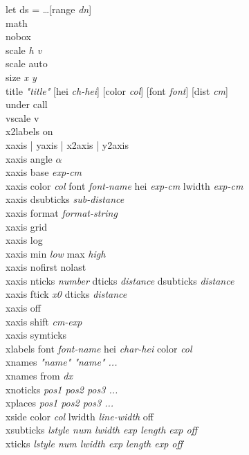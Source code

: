 {\sf let ds = \ldots [range {\it dn}]} \\
{\sf math } \\
{\sf nobox } \\
{\sf scale {\it h v}} \\
{\sf scale auto} \\
{\sf size {\it x y }}\\
{\sf title {\it "title"}  [hei {\it ch-hei}] [color {\it col}] [font {\it font}] [dist {\it cm}]  }   \\
{\sf under call} \\
{\sf vscale v} \\
{\sf x2labels on} \\
{\sf xaxis | yaxis | x2axis | y2axis}\\
{\sf xaxis angle $\alpha$} \\
{\sf xaxis base {\it exp-cm}}  \\
{\sf xaxis color {\it col} font {\it font-name}  hei {\it exp-cm} lwidth {\it exp-cm}} \\
{\sf xaxis dsubticks {\it sub-distance} }  \\
{\sf xaxis format {\it format-string} } \\
{\sf xaxis grid }  \\
{\sf xaxis log}  \\
{\sf xaxis min {\it low} max {\it high}}  \\
{\sf xaxis nofirst nolast}  \\
{\sf xaxis nticks {\it number} dticks {\it distance} dsubticks {\it distance}} \\
{\sf xaxis ftick {\it x0} dticks {\it distance}} \\
{\sf xaxis off}  \\
{\sf xaxis shift {\it cm-exp}}  \\
{\sf xaxis symticks} \\
{\sf xlabels font {\it font-name} hei {\it char-hei} color {\it col} }\\
{\sf xnames {\it "name"  "name" ...}}  \\
{\sf xnames from {\it dx}}  \\
{\sf xnoticks {\it pos1 pos2 pos3 ...}}  \\
{\sf xplaces {\it pos1 pos2 pos3 ...}}  \\
{\sf xside color {\it col} lwidth {\it line-width} off  } \\
{\sf xsubticks {\it {\sf lstyle} num  {\sf lwidth} exp {\sf length} exp  {\sf off}}} \\
{\sf xticks {\it {\sf lstyle} num {\sf lwidth} exp {\sf length} exp {\sf off}}} \\
